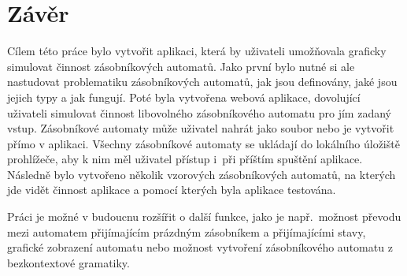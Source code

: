 \chapter{Závěr}\label{chap:Conclusion}

Cílem této práce bylo vytvořit aplikaci, která by uživateli umožňovala graficky simulovat činnost zásobníkových automatů. Jako první bylo nutné si ale nastudovat problematiku zásobníkových automatů, jak jsou definovány, jaké jsou jejich typy a jak fungují. Poté byla vytvořena webová aplikace, dovolující uživateli simulovat činnost libovolného zásobníkového automatu pro jím zadaný vstup. Zásobníkové automaty může uživatel nahrát jako soubor nebo je vytvořit přímo v aplikaci. Všechny zásobníkové automaty se ukládají do lokálního úložiště prohlížeče, aby k nim měl uživatel přístup i~při příštím spuštění aplikace. Následně bylo vytvořeno několik vzorových zásobníkových automatů, na kterých jde vidět činnost aplikace a pomocí kterých byla aplikace testována.

Práci je možné v budoucnu rozšířit o další funkce, jako je např.\ možnost převodu mezi automatem přijímajícím prázdným zásobníkem a přijímajícími stavy, grafické zobrazení automatu nebo možnost vytvoření zásobníkového automatu z bezkontextové gramatiky.
\endinput